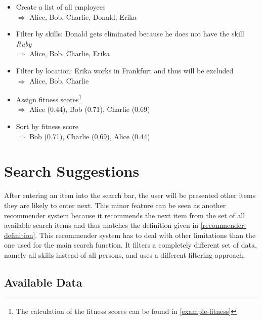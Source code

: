 \begin{itemize}
  \item Create a list of all employees\\
    $\Rightarrow$ Alice, Bob, Charlie, Donald, Erika
  \item Filter by skills: Donald gets eliminated because he does not have the skill \textit{Ruby}\\
    $\Rightarrow$ Alice, Bob, Charlie, Erika
  \item Filter by location: Erika works in Frankfurt and thus will be excluded\\
    $\Rightarrow$ Alice, Bob, Charlie
  \item Assign fitness scores\footnote{The calculation of the fitness scores can be found in \ref{example-fitness}}\\
    $\Rightarrow$ Alice (0.44), Bob (0.71), Charlie (0.69)
  \item Sort by fitness score\\
    $\Rightarrow$ Bob (0.71), Charlie (0.69), Alice (0.44)
\end{itemize}



\section{Search Suggestions}
\label{autocomplete}
After entering an item into the search bar, the user will be presented other items they are likely to enter next. This minor feature can be seen as another
recommender system because it recommends the next item from the set of all available search items and thus matches the definition given in \ref{recommender-definition}. This recommender system has to deal with other limitations than the one used for the main search function. It filters a completely different set of data, namely all skills instead of all persons, and uses a different filtering approach.

\subsection{Available Data}

